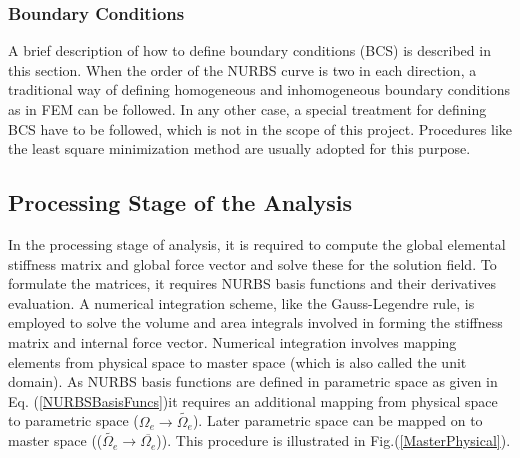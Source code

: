 \documentclass[11pt]{article}
\begin{document}
\subsubsection{Boundary Conditions}
A brief description of how to define boundary conditions (BCS) is described in this section. When the order of the NURBS curve is two in each direction, a traditional way of defining homogeneous and inhomogeneous boundary conditions as in FEM can be followed. In any other case, a special treatment for defining BCS have to be followed, which is not in the scope of this project. Procedures like the least square minimization method are usually adopted for this purpose. 


\subsection{Processing Stage of the Analysis} \label{ProcessingStage}
In the processing stage of analysis, it is required to compute the global elemental stiffness matrix and global force vector and solve these for the solution field. To formulate the matrices, it requires NURBS basis functions and their derivatives evaluation. A numerical integration scheme, like the Gauss-Legendre rule, is employed to solve the volume and area integrals involved in forming the stiffness matrix and internal force vector. Numerical integration involves mapping elements from physical space to master space (which is also called the unit domain). As NURBS basis functions are defined in parametric space as given in Eq. (\ref{NURBSBasisFuncs})it requires an additional mapping from physical space to parametric space ($\Omega_e \rightarrow \widetilde{\Omega_e}$). Later parametric space can be mapped on to master space (($\widetilde{\Omega_e} \rightarrow \overline{\Omega_e}$)). This procedure is illustrated in Fig.(\ref{MasterPhysical}).
\end{document}
